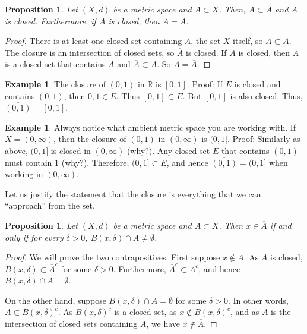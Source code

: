 \documentclass[12pt,openany]{book}
\newcommand{\widebar}[1]{\overline{#1}}
\newcommand{\R}{{\mathbb{R}}}
\newcommand{\myquote}[1]{``#1''}
\theoremstyle{plain}
\newtheorem{prop}[thm]{Proposition}
\theoremstyle{remark}
\theoremstyle{definition}
\theoremstyle{exercise}
\theoremstyle{example}
\newtheorem{example}[thm]{Example}
\begin{document}
\begin{prop}
Let $(X,d)$ be a metric space and $A \subset X$.
Then, $A \subset \widebar{A}$ and $\widebar{A}$ is closed.
Furthermore, if $A$ is closed, then $\widebar{A} = A$.
\end{prop}

\begin{proof}
There is at least one closed set containing $A$, the set $X$ itself,
so $A \subset \widebar{A}$.
The closure is an intersection of closed sets, so $\widebar{A}$ is closed.
If $A$ is closed, then $A$ is a closed set that contains $A$
and $\widebar{A} \subset A$.  So $A = \widebar{A}$.
\end{proof}

\begin{example}
The closure of $(0,1)$ in $\R$ is $[0,1]$.  Proof:  If
$E$ is closed and contains $(0,1)$, then $0,1 \in E$.
Thus $[0,1] \subset E$.  But $[0,1]$ is also closed.
Thus, $\overline{(0,1)} = [0,1]$.
\end{example}

\begin{example}
Always notice what ambient metric space you are working with.
If $X = (0,\infty)$, then
the closure of $(0,1)$ in $(0,\infty)$ is $(0,1]$.  Proof:  Similarly as
above, $(0,1]$ is closed in $(0,\infty)$ (why?).  Any closed set $E$
that contains $(0,1)$ must contain $1$ (why?).  Therefore, $(0,1] \subset E$,
and hence $\overline{(0,1)} = (0,1]$ when working in $(0,\infty)$.
\end{example}

Let us justify the statement that the closure is everything that we can
\myquote{approach} from the set.

\begin{prop} \label{prop:msclosureappr}
Let $(X,d)$ be a metric space and $A \subset X$.  Then $x \in \widebar{A}$
if and only if for every $\delta > 0$, $B(x,\delta) \cap A \neq \emptyset$.
\end{prop}

\begin{proof}
We will prove the two contrapositives.
First suppose $x \notin \widebar{A}$.  As $\widebar{A}$ is
closed,
$B(x,\delta) \subset \widebar{A}^c$
for some $\delta > 0$.
Furthermore, $\widebar{A}^c \subset A^c$, and hence
$B(x,\delta) \cap A = \emptyset$.

On the other hand, suppose 
$B(x,\delta) \cap A = \emptyset$ for some $\delta > 0$. 
In other words,
$A \subset {B(x,\delta)}^c$.
As 
${B(x,\delta)}^c$ is a closed set, as $x \not \in {B(x,\delta)}^c$,
and as $\widebar{A}$ is the intersection
of closed sets containing $A$, we have $x \notin \widebar{A}$.
\end{proof}
\end{document}

